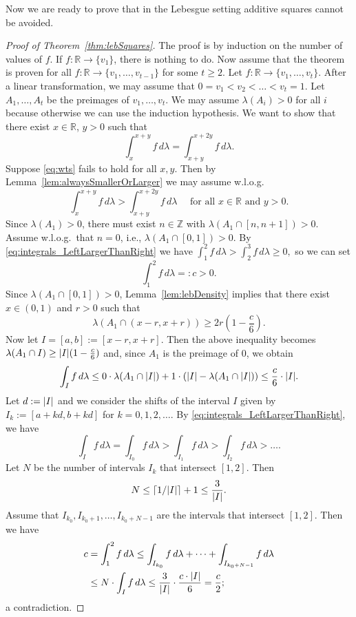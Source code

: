 \documentclass{amsart}
\theoremstyle{plain}
\DeclarePairedDelimiter\ceil{\lceil}{\rceil}
\DeclarePairedDelimiter\abs{\lvert}{\rvert}
\newcommand{\Z}{\mathbb{Z}}
\newcommand{\R}{\mathbb{R}}
\begin{document}
Now we are ready to prove that in the Lebesgue setting additive squares cannot be avoided.

\begin{proof}[Proof of Theorem~\ref{thm:lebSquares}]

The proof is by induction on the number of values of $f$.
If $f \colon \R \to \{ v_1\}$, there is nothing to do.
Now assume that the theorem is proven for all $f \colon \R \to \{v_1, \ldots, v_{t-1}\}$ for some $t\geq 2$.
Let $f \colon \R \to \{v_1, \ldots , v_t\}$.
After a linear transformation, we may assume that $0 = v_1 < v_2 < \dots < v_t = 1$.
Let $A_1, \ldots, A_t$ be the preimages of $v_1, \ldots, v_t$.
We may assume $\lambda(A_i) > 0$ for all $i$ because otherwise we can use the induction hypothesis.
We want to show that there exist $x \in \R$, $y>0$ such that 
\begin{equation}\label{eq:wts}
    \int_x^{x+y} f\, d \lambda   
    = \int_{x+y}^{x+2y} f\, d \lambda.
\end{equation}
Suppose \eqref{eq:wts} fails to hold for all $x,y$.
Then by Lemma~\ref{lem:alwaysSmallerOrLarger} we may assume w.l.o.g.
\begin{equation}\label{eq:integrals_LeftLargerThanRight}
    \int_x^{x+y} f\, d \lambda 
    > \int_{x+y}^{x+2y} f\, d \lambda 
    \quad \text{ for all } x \in \R \text{ and } y>0.
\end{equation}
Since $\lambda(A_1)>0$, there must exist $n \in \Z$ with 
$\lambda(A_1 \cap [n,n+1]) > 0$. 
Assume w.l.o.g.\ that $n = 0$, i.e., $\lambda(A_1 \cap [0,1]) > 0$.
By \eqref{eq:integrals_LeftLargerThanRight} we have 
$
    \int_1^2 f\, d \lambda
    > \int_2^3 f\, d \lambda
    \geq 0,
$
so we can set 
\[
    \int_1^2 f\, d \lambda =:c >0.
\]
Since $\lambda(A_1 \cap [0,1]) > 0$, Lemma~\ref{lem:lebDensity} implies that there exist
$x \in (0,1)$ and $r >0$ such that
\[
    \lambda(A_1 \cap (x-r, x+r)) 
    \geq 2r ( 1 - \frac{c}{6}).
\]
Now let $I = [a,b] := [x-r, x+r]$.
Then the above inequality becomes $\lambda(A_1 \cap I) \geq \abs{I} ( 1 - \frac{c}{6})$ and, since $A_1$ is the preimage of $0$, we obtain
\[
    \int_{I} f\, d \lambda
    \leq 0 \cdot \lambda(A_1 \cap \abs{I}) + 1 \cdot (\abs{I} - \lambda(A_1 \cap \abs{I})) 
    \leq \frac{c}{6} \cdot \abs{I}.
\]
Let $d : = \abs{I}$ and we consider the shifts of the interval $I$ given by $I_k := [a+kd, b+ kd]$ for $k = 0, 1, 2, \ldots$.
By \eqref{eq:integrals_LeftLargerThanRight}, we have
\[
    \int_{I} f\, d \lambda
    = \int_{I_0} f\, d \lambda
    > \int_{I_1} f\, d \lambda
    > \int_{I_2} f\, d \lambda
    > \dots.
\]
Let $N$ be the number of intervals $I_k$ that intersect $[1,2]$.
Then
\[
    N \leq \ceil{1/\abs{I}} + 1
    \leq \frac{3}{\abs{I}}.
\]
Assume that $I_{k_0}, I_{k_0 + 1}, \ldots , I_{k_0 + N - 1}$ are the intervals that intersect $[1,2]$. Then we have
\begin{align*}
    c
    &= \int_1^2 f\, d \lambda
    \leq \int_{I_{k_0}} f\, d \lambda + \dots + \int_{I_{k_0 + N - 1}} f\, d \lambda \\
    &\leq N \cdot \int_{I} f\, d \lambda
    \leq \frac{3}{\abs{I}} \cdot \frac{c\cdot \abs{I}}{6} 
    = \frac{c}{2};
\end{align*}
a contradiction.


\end{proof}
\end{document}
